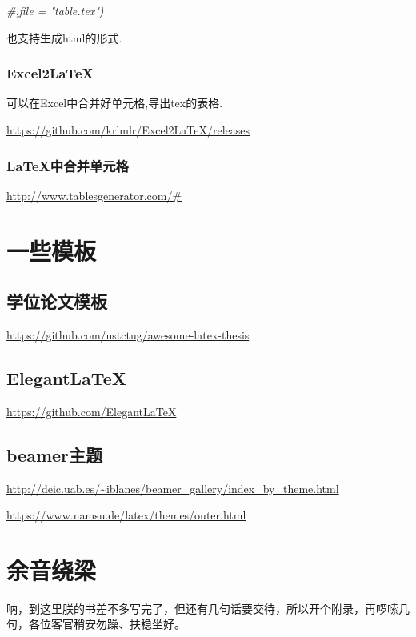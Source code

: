 \documentclass[]{ctexbook}
\newenvironment{Shaded}{\begin{snugshade}}{\end{snugshade}}
\newcommand{\CommentTok}[1]{\textcolor[rgb]{0.56,0.35,0.01}{\textit{#1}}}
\begin{document}
\begin{Shaded}
\begin{Highlighting}[]
    \CommentTok{#,file = "table.tex")}
\end{Highlighting}
\end{Shaded}

也支持生成html的形式.

\hypertarget{excel2latex}{%
\subsection{Excel2LaTeX}\label{excel2latex}}

可以在Excel中合并好单元格,导出tex的表格.

\url{https://github.com/krlmlr/Excel2LaTeX/releases}

\hypertarget{latex}{%
\subsection{LaTeX中合并单元格}\label{latex}}

\url{http://www.tablesgenerator.com/\#}

\hypertarget{section-19}{%
\chapter{一些模板}\label{section-19}}

\hypertarget{section-20}{%
\section{学位论文模板}\label{section-20}}

\url{https://github.com/ustctug/awesome-latex-thesis}

\hypertarget{elegantlatex}{%
\section{ElegantLaTeX}\label{elegantlatex}}

\url{https://github.com/ElegantLaTeX}

\hypertarget{beamer}{%
\section{beamer主题}\label{beamer}}

\url{http://deic.uab.es/~iblanes/beamer_gallery/index_by_theme.html}

\url{https://www.namsu.de/latex/themes/outer.html}

\cleardoublepage

\hypertarget{appendix-}{%
\appendix {}}


\hypertarget{sound}{%
\chapter{余音绕梁}\label{sound}}

呐，到这里朕的书差不多写完了，但还有几句话要交待，所以开个附录，再啰嗦几句，各位客官稍安勿躁、扶稳坐好。



\backmatter
\printindex
\end{document}
